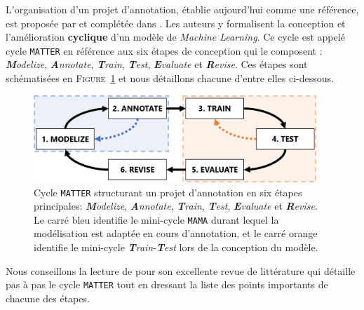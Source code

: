 		L'organisation d'un projet d'annotation, établie aujourd'hui comme une référence, est proposée par \cite{pustejovsky-stubbs:2012:natural-language-annotation} et complétée dans \cite{stubbs:2013:methodology-using-professional}.
		Les auteurs y formalisent la conception et l'amélioration \textbf{cyclique} d'un modèle de \textit{Machine Learning}.
		Ce cycle est appelé cycle \texttt{MATTER} en référence aux six étapes de conception qui le composent : \textit{\textbf{M}odelize}, \textit{\textbf{A}nnotate}, \textit{\textbf{T}rain}, \textit{\textbf{T}est}, \textit{\textbf{E}valuate} et \textit{\textbf{R}evise}.
		Ces étapes sont schématisées en \textsc{Figure~\ref{figure:2.2.1-ORGANISATION-ANNOTATION-ETAPES-CLES-MATTER}} et nous détaillons chacune d'entre elles ci-dessous.
		\begin{figure}[!htb]
			\centering
			\includegraphics[width=0.95\textwidth]{figures/etatdelart-pustejovsky-2012-cycle-matter-mama-tt}
			\caption{
				Cycle \texttt{MATTER} structurant un projet d'annotation en six étapes principales: \textit{\textbf{M}odelize}, \textit{\textbf{A}nnotate}, \textit{\textbf{T}rain}, \textit{\textbf{T}est}, \textit{\textbf{E}valuate} et \textit{\textbf{R}evise}. \\
				Le carré bleu identifie le mini-cycle \texttt{MAMA} durant lequel la modélisation est adaptée en cours d'annotation,
				et le carré orange identifie le mini-cycle \textit{\textbf{T}rain}-\textit{\textbf{T}est} lors de la conception du modèle.
			}
			\label{figure:2.2.1-ORGANISATION-ANNOTATION-ETAPES-CLES-MATTER}
		\end{figure}
		\begin{leftBarAuthorOpinion}
			Nous conseillons la lecture de \cite{finlayson-erjavec:2016:overview-annotation-creation} pour son excellente revue de littérature qui détaille pas à pas le cycle \texttt{MATTER} tout en dressant la liste des points importants de chacune des étapes.
		\end{leftBarAuthorOpinion}
		
